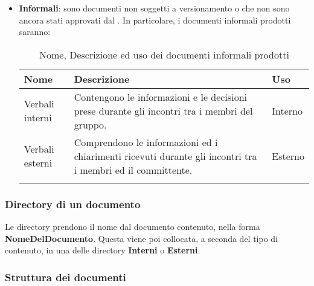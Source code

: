\begin{itemize}
\item \textbf{Informali}: sono documenti non soggetti a versionamento o che non sono ancora stati approvati dal \RdP{}. \newline 
In particolare, i documenti informali prodotti saranno:
{
	\setlength{\freewidth}{\dimexpr\textwidth-1\tabcolsep}
	\renewcommand{\arraystretch}{1.5}
	\setlength{\aboverulesep}{0pt}
	\setlength{\belowrulesep}{0pt}
	\begin{longtable}{L{.210\freewidth} L{.6\freewidth} L{.080\freewidth}}
		\toprule 
		\textbf{Nome} & \textbf{Descrizione} & \textbf{Uso}\\
		\toprule
		\endhead		
		Verbali interni & Contengono le informazioni e le decisioni prese durante gli incontri tra i membri del gruppo. & Interno \\ 
		Verbali esterni & Comprendono le informazioni ed i chiarimenti ricevuti durante gli incontri tra i membri ed il committente. & Esterno \\
		\bottomrule
		\hiderowcolors
		\caption{Nome, Descrizione ed uso dei documenti informali prodotti}
	\end{longtable}
}
\end{itemize}
\subsubsection{Directory di un documento}
Le directory prendono il nome dal documento contenuto, nella forma \textbf{NomeDelDocumento}. Questa viene poi collocata, a seconda del tipo di contenuto, in una delle directory \textbf{Interni} o \textbf{Esterni}. 
\subsubsection{Struttura dei documenti}

